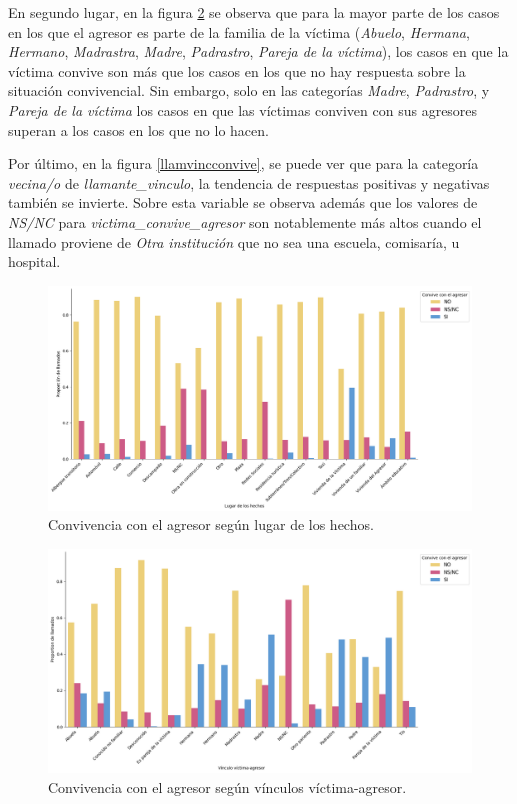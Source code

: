 \documentclass[10 pt]{article}
\begin{document}
En segundo lugar, en la figura \ref{agrvincconvive} se observa que para la mayor parte de los casos en los que el agresor es parte de la familia de la víctima (\textit{Abuelo}, \textit{Hermana}, \textit{Hermano}, \textit{Madrastra}, \textit{Madre}, \textit{Padrastro}, \textit{Pareja de la víctima}), los casos en que la víctima convive son más que los casos en los que no hay respuesta sobre la situación convivencial. Sin embargo, solo en las categorías \textit{Madre}, \textit{Padrastro}, y \textit{Pareja de la víctima} los casos en que las víctimas conviven con sus agresores superan a los casos en los que no lo hacen.

Por último, en la figura \ref{llamvincconvive}, se puede ver que para la categoría \textit{vecina/o} de \textit{llamante\_vinculo}, la tendencia de respuestas positivas y negativas también se invierte. Sobre esta variable se observa además que los valores de \textit{NS/NC} para \textit{victima\_convive\_agresor} son notablemente más altos cuando el llamado proviene de \textit{Otra institución} que no sea una escuela, comisaría, u hospital. 


\begin{figure}[H]
\begin{center}
\includegraphics[scale=.5]{images/latex_hecho_lugar_convive.png}
\caption{Convivencia con el agresor según lugar de los hechos.}
\label{hecholugconvive}
\end{center}
\end{figure}
    
\begin{figure}[H]
\begin{center}
\includegraphics[scale=.5]{images/convive_vinc_agresor.png}
\caption{Convivencia con el agresor según vínculos víctima-agresor.}
\label{agrvincconvive}
\end{center}
\end{figure} 
\end{document}
